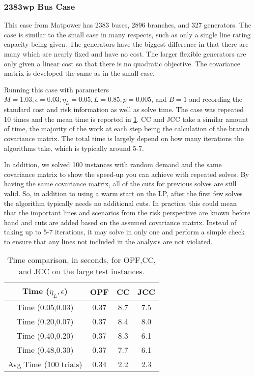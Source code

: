 \subsubsection*{2383wp Bus Case}
This case from Matpower has 2383 buses, 2896 branches, and 327 generators.  The case is similar to the small case in many respects, such as only a single line rating capacity being given.  The generators have the biggest difference in that there are many which are nearly fixed and have no cost.  The larger flexible generators are only given a linear cost so that there is no quadratic objective.  The covariance matrix is developed the same as in the small case.

Running this case with parameters $M=1.03, \epsilon=0.03, \eta_L=0.05, L=0.85, p=0.005$, and $B=1$ and recording the standard cost and risk information as well as solve time.  The case was repeated 10 times and the mean time is reported in \ref{solve_time}.  CC and JCC take a similar amount of time, the majority of the work at each step being the calculation of the branch covariance matrix.  The total time is largely depend on how many iterations the algorithms take, which is typically around 5-7. 

In addition, we solved 100 instances with random demand and the same covariance matrix to show the speed-up you can achieve with repeated solves.  By having the same covariance matrix, all of the cuts for previous solves are still valid.  So, in addition to using a warm start on the LP, after the first few solves the algorithm typically needs no additional cuts.  In practice, this could mean that the important lines and scenarios from the risk perspective are known before hand and cuts are added based on the assumed covariance matrix.  Instead of taking up to 5-7 iterations, it may solve in only one and perform a simple check to ensure that any lines not included in the analysis are not violated.

\begin{table}
\centering
\begin{tabular}{| c| c c c| }
\hline
Time ($\eta_L,\epsilon$) & OPF & CC & JCC \\
\hline
\hline
Time (0.05,0.03)& 0.37  & 8.7 & 7.5 \\
Time (0.20,0.07)& 0.37  & 8.4 & 8.0 \\
Time (0.40,0.20)& 0.37  & 8.3 & 6.1 \\
Time (0.48,0.30)& 0.37  & 7.7 & 6.1 \\
\hline
\hline
Avg Time (100 trials)& 0.34  & 2.2 & 2.3 \\
\hline
\end{tabular}
\caption{Time comparison, in seconds, for OPF,CC, and JCC on the large test instances.}\label{solve_time}
\end{table}

